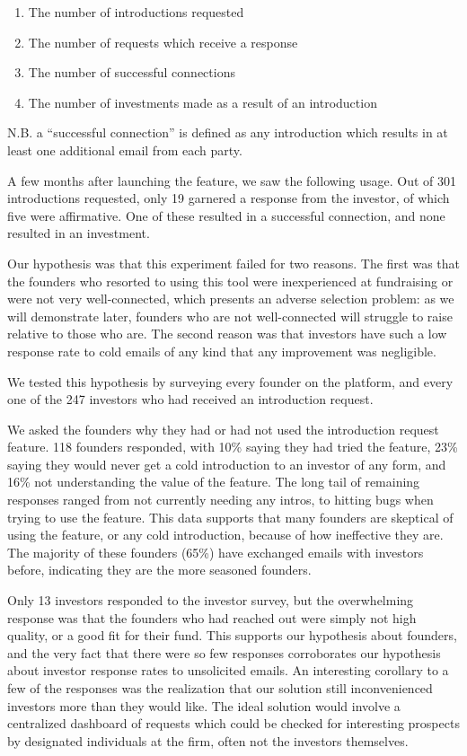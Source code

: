 \begin{enumerate}
  \item The number of introductions requested
  \item The number of requests which receive a response
  \item The number of successful connections
  \item The number of investments made as a result of an introduction
\end{enumerate}

N.B. a ``successful connection'' is defined as any introduction which results in at least one additional email from each party.

A few months after launching the feature, we saw the following usage. Out of 301 introductions requested, only 19 garnered a response from the investor, of which five were affirmative. One of these resulted in a successful connection, and none resulted in an investment.

Our hypothesis was that this experiment failed for two reasons. The first was that the founders who resorted to using this tool were inexperienced at fundraising or were not very well-connected, which presents an adverse selection problem: as we will demonstrate later, founders who are not well-connected will struggle to raise relative to those who are. The second reason was that investors have such a low response rate to cold emails of any kind that any improvement was negligible.

We tested this hypothesis by surveying every founder on the platform, and every one of the 247 investors who had received an introduction request.

We asked the founders why they had or had not used the introduction request feature. 118 founders responded, with 10\% saying they had tried the feature, 23\% saying they would never get a cold introduction to an investor of any form, and 16\% not understanding the value of the feature. The long tail of remaining responses ranged from not currently needing any intros, to hitting bugs when trying to use the feature. This data supports that many founders are skeptical of using the feature, or any cold introduction, because of how ineffective they are. The majority of these founders (65\%) have exchanged emails with investors before, indicating they are the more seasoned founders.

Only 13 investors responded to the investor survey, but the overwhelming response was that the founders who had reached out were simply not high quality, or a good fit for their fund. This supports our hypothesis about founders, and the very fact that there were so few responses corroborates our hypothesis about investor response rates to unsolicited emails. An interesting corollary to a few of the responses was the realization that our solution still inconvenienced investors more than they would like. The ideal solution would involve a centralized dashboard of requests which could be checked for interesting prospects by designated individuals at the firm, often not the investors themselves.

